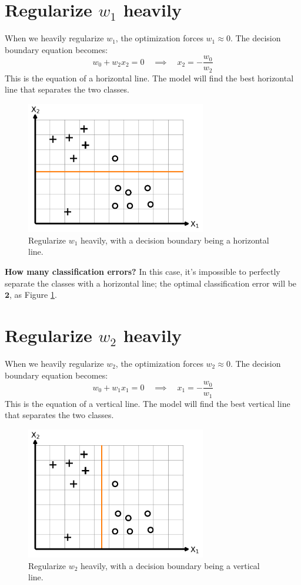 \documentclass[11pt, a4paper, oneside]{memoir}
\begin{document}
\section[Regularize w1 heavily]{Regularize $w_1$ heavily}
When we heavily regularize $w_1$, the optimization forces $w_1 \approx 0$. The decision boundary equation becomes:
\[ w_0 + w_2x_2 = 0 \quad \implies \quad x_2 = -\frac{w_0}{w_2} \]
This is the equation of a horizontal line. The model will find the best horizontal line that separates the two classes.

\begin{figure}[H]
  \centering
  \includegraphics[width=0.7\textwidth]{code/result/problem6_3.pdf}
  \caption{Regularize $w_1$ heavily, with a decision boundary being a horizontal line.}
  \label{fig:problem6_3}
\end{figure}

\textbf{How many classification errors?} In this case, it's impossible to perfectly separate the classes with a horizontal line;
the optimal classification error will be $\textbf{2}$, as Figure \ref{fig:problem6_3}.

\section[Regularize w2 heavily]{Regularize $w_2$ heavily}
When we heavily regularize $w_2$, the optimization forces $w_2 \approx 0$. The decision boundary equation becomes:
\[ w_0 + w_1x_1 = 0 \quad \implies \quad x_1 = -\frac{w_0}{w_1} \]
This is the equation of a vertical line. The model will find the best vertical line that separates the two classes.

\begin{figure}[H]
  \centering
  \includegraphics[width=0.7\textwidth]{code/result/problem6_4.pdf}
  \caption{Regularize $w_2$ heavily, with a decision boundary being a vertical line.}
  \label{fig:problem6_4}
\end{figure}
\end{document}
